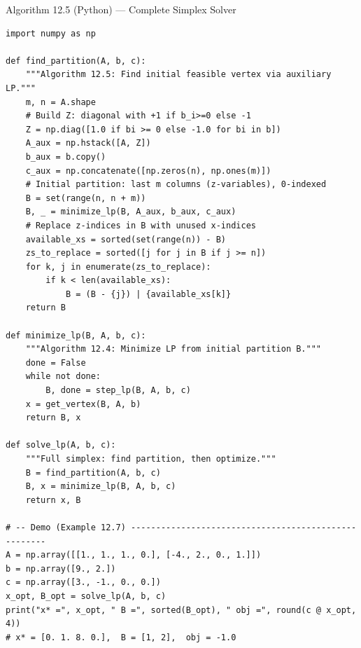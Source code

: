 \documentclass[aspectratio=169,10pt]{beamer}
\begin{document}
\begin{frame}[fragile]{Algorithm 12.5 (Python) --- Complete Simplex Solver}
\begin{lstlisting}
import numpy as np

def find_partition(A, b, c):
    """Algorithm 12.5: Find initial feasible vertex via auxiliary LP."""
    m, n = A.shape
    # Build Z: diagonal with +1 if b_i>=0 else -1
    Z = np.diag([1.0 if bi >= 0 else -1.0 for bi in b])
    A_aux = np.hstack([A, Z])
    b_aux = b.copy()
    c_aux = np.concatenate([np.zeros(n), np.ones(m)])
    # Initial partition: last m columns (z-variables), 0-indexed
    B = set(range(n, n + m))
    B, _ = minimize_lp(B, A_aux, b_aux, c_aux)
    # Replace z-indices in B with unused x-indices
    available_xs = sorted(set(range(n)) - B)
    zs_to_replace = sorted([j for j in B if j >= n])
    for k, j in enumerate(zs_to_replace):
        if k < len(available_xs):
            B = (B - {j}) | {available_xs[k]}
    return B

def minimize_lp(B, A, b, c):
    """Algorithm 12.4: Minimize LP from initial partition B."""
    done = False
    while not done:
        B, done = step_lp(B, A, b, c)
    x = get_vertex(B, A, b)
    return B, x

def solve_lp(A, b, c):
    """Full simplex: find partition, then optimize."""
    B = find_partition(A, b, c)
    B, x = minimize_lp(B, A, b, c)
    return x, B

# -- Demo (Example 12.7) -----------------------------------------------------
A = np.array([[1., 1., 1., 0.], [-4., 2., 0., 1.]])
b = np.array([9., 2.])
c = np.array([3., -1., 0., 0.])
x_opt, B_opt = solve_lp(A, b, c)
print("x* =", x_opt, " B =", sorted(B_opt), " obj =", round(c @ x_opt, 4))
# x* = [0. 1. 8. 0.],  B = [1, 2],  obj = -1.0
\end{lstlisting}
\end{frame}
\end{document}
